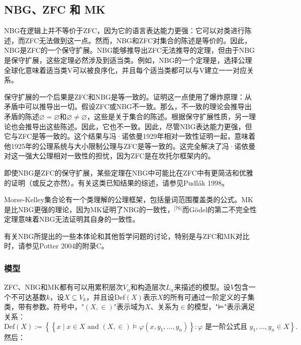 \subsection{NBG、ZFC 和 MK}  
NBG在逻辑上并不等价于ZFC，因为它的语言表达能力更强：它可以对类进行陈述，而ZFC无法做到这一点。然而，NBG和ZFC对集合的陈述是等价的。因此，NBG是ZFC的一个保守扩展。NBG能够推导出ZFC无法推导的定理，但由于NBG是保守扩展，这些定理必然涉及到适当类。例如，NBG的一个定理是，选择公理全球化意味着适当类V可以被良序化，并且每个适当类都可以与V建立一一对应关系。

保守扩展的一个后果是ZFC和NBG是等一致的。证明这一点使用了爆炸原理：从矛盾中可以推导出一切。假设ZFC或NBG不一致。那么，不一致的理论会推导出矛盾的陈述\(\varnothing = \varnothing\)和\(\varnothing \ne \varnothing\)，这些是关于集合的陈述。根据保守扩展性质，另一理论也会推导出这些陈述。因此，它也不一致。因此，尽管NBG表达能力更强，但它与ZFC是等一致的。这个结果与冯·诺依曼1929年相对一致性证明一起，意味着他1925年的公理系统与大小限制公理与ZFC是等一致的。这完全解决了冯·诺依曼对这一强大公理相对一致性的担忧，因为ZFC是在坎托尔框架内的。

即使NBG是ZFC的保守扩展，某些定理在NBG中可能比在ZFC中有更简洁和优雅的证明（或反之亦然）。有关这类已知结果的综述，请参见Pudlák 1998。

Morse-Kelley集合论有一个类理解的公理框架，包括量词范围覆盖类的公式。MK是比NBG更强的理论，因为MK证明了NBG的一致性，\(^\text{[76]}\)而Gödel的第二不完全性定理意味着NBG无法证明其自身的一致性。

有关NBG所提出的一些本体论和其他哲学问题的讨论，特别是与ZFC和MK对比时，请参见Potter 2004的附录C。
\subsubsection{模型}  
ZFC、NBG和MK都有可以用累积层次\(V_\alpha\)和构造层次\(L_\alpha\)来描述的模型。设\(V\)包含一个不可达基数\(k\)，设\(X \subseteq V_k\)，并且设Def\((X)\)表示\(X\)的所有可通过一阶定义的子集类，带有参数。符号中，"\((X, \in)\)"表示域为\(X\)、关系为\(\in\)的模型，"⊨"表示满足关系：
\[
\text{Def}(X) := \left\{ \left\{ x \mid x \in X \text{ and } (X, \in) \models \varphi(x, y_1, \ldots, y_n) \right\} : \varphi \text{ 是一阶公式且 } y_1, \ldots, y_n \in X \right\}.~
\]
然后：

